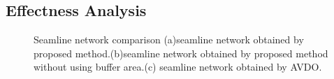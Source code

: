 \documentclass[journal]{IEEEtran}
\begin{document}
\subsection{Effectness Analysis}

\begin{figure}[!t]
	\centering
	\caption{Seamline network comparison (a)seamline network obtained by proposed method.(b)seamline network obtained by proposed method without using buffer area.(c) seamline network obtained by AVDO.}
	\label{fig:mosaic-overall-performance}
\end{figure}
\end{document}
